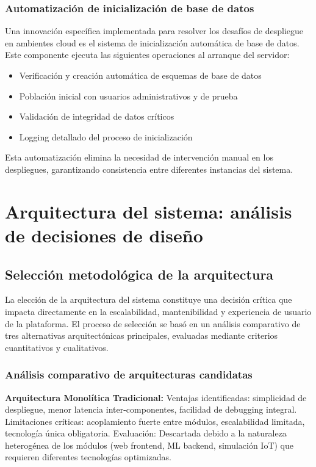 \subsubsection{Automatización de inicialización de base de datos}

Una innovación específica implementada para resolver los desafíos de despliegue en ambientes cloud es el sistema de inicialización automática de base de datos. Este componente ejecuta las siguientes operaciones al arranque del servidor:

\begin{itemize}
    \item Verificación y creación automática de esquemas de base de datos
    \item Población inicial con usuarios administrativos y de prueba
    \item Validación de integridad de datos críticos
    \item Logging detallado del proceso de inicialización
\end{itemize}

Esta automatización elimina la necesidad de intervención manual en los despliegues, garantizando consistencia entre diferentes instancias del sistema.

\section{Arquitectura del sistema: análisis de decisiones de diseño}

\subsection{Selección metodológica de la arquitectura}

La elección de la arquitectura del sistema constituye una decisión crítica que impacta directamente en la escalabilidad, mantenibilidad y experiencia de usuario de la plataforma. El proceso de selección se basó en un análisis comparativo de tres alternativas arquitectónicas principales, evaluadas mediante criterios cuantitativos y cualitativos.

\subsubsection{Análisis comparativo de arquitecturas candidatas}

\textbf{Arquitectura Monolítica Tradicional:}
Ventajas identificadas: simplicidad de despliegue, menor latencia inter-componentes, facilidad de debugging integral. 
Limitaciones críticas: acoplamiento fuerte entre módulos, escalabilidad limitada, tecnología única obligatoria.
Evaluación: Descartada debido a la naturaleza heterogénea de los módulos (web frontend, ML backend, simulación IoT) que requieren diferentes tecnologías optimizadas.

